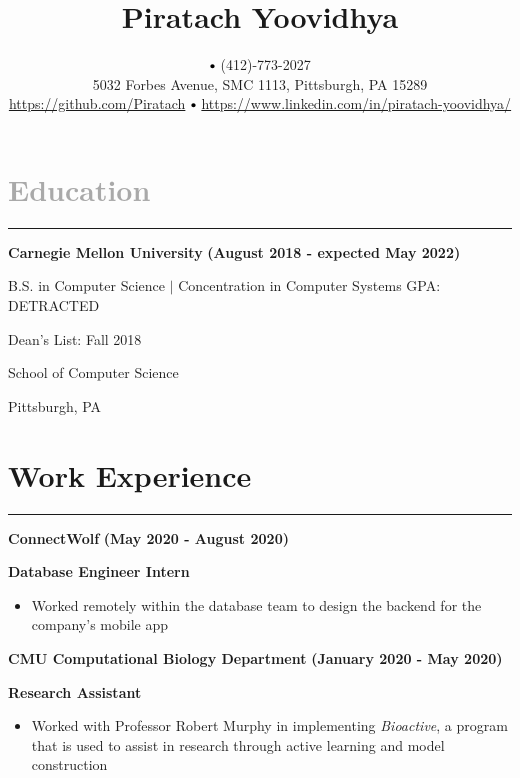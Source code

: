 \documentclass[10pt]{article}
\title{\bfseries\Huge Piratach Yoovidhya}
\author{
  \myemail
   $\sbullet[.75]$
  (412)-773-2027 \\
  5032 Forbes Avenue, SMC 1113, Pittsburgh, PA 15289 \\
  \href{https://github.com/Piratach}{https://github.com/Piratach}
   $\sbullet[.75]$
  \href{https://www.linkedin.com/in/piratach-yoovidhya/}
  {https://www.linkedin.com/in/piratach-yoovidhya/}
  }
\date{}
\begin{document}
  \maketitle
  \thispagestyle{empty}

  \vspace*{-1.4cm}
  \section*{\LARGE \textcolor{darkgray}{Education}}
  \vspace*{-0.1cm}
  \hrule depth 0.2mm \relax
  \vspace{0.2cm}
  \textbf{\large Carnegie Mellon University} \hfill \textbf{(August 2018 - expected May 2022)}

  B.S. in Computer Science $\mid$ Concentration in Computer Systems \hfill GPA: DETRACTED

  Dean's List: Fall 2018

  School of Computer Science

  Pittsburgh, PA

  \vspace*{-0.4cm}
  \section*{\LARGE Work Experience}
  \vspace*{-0.1cm}
  \hrule depth 0.2mm \relax
  \vspace{0.2cm}
  \textbf{\large ConnectWolf} \hfill \textbf{(May 2020 - August 2020)}

  \textbf{Database Engineer Intern}
  \vspace*{-0.25cm}
  \begin{itemize}
    \item Worked remotely within the database team to design the backend for the company's mobile app
  \end{itemize}


  \textbf{\large CMU Computational Biology Department} \hfill \textbf{(January 2020 - May 2020)}

  \textbf{Research Assistant}

  \vspace*{-0.25cm}
  \begin{itemize}
    \item Worked with Professor Robert Murphy in implementing \textit{Bioactive}, a program that is used to assist in research through active learning and model construction
  \end{itemize}
\end{document}
